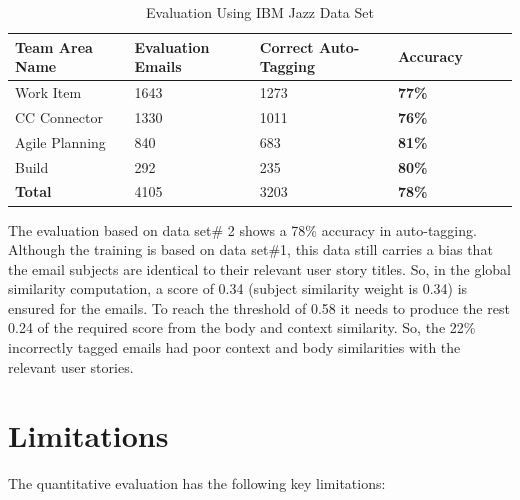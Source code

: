 \begin{table}[h!]
  \centering
  \caption{Evaluation Using IBM Jazz Data Set}
	\label{tab:jazz_evaluation}
    \begin{tabular}{|p{4cm}|p{3cm}|p{3cm}|p{2cm}|p{2cm}|p{2cm}|p{2cm}|}
      \hline
      \textbf{Team Area Name} & \textbf{Evaluation Emails} & \textbf{Correct Auto-Tagging} & \textbf{Accuracy}\\
      \hline
      Work Item 				& 1643 	 	&	1273 & \textbf{77\%}\\
      \hline
      CC Connector 			& 1330 			&	1011	& \textbf{76\%}\\
      \hline
      Agile Planning 		& 840 		 	& 683		& \textbf{81\%}\\
   		\hline
      Build 						& 292 			&	235		& \textbf{80\%}\\
      \hline
      \textbf{Total} 		& 4105 				& 3203 	& \textbf{78\%}\\
      \hline
    \end{tabular}
\end{table}

The evaluation based on data set\# 2 shows a 78\% accuracy in auto-tagging. Although the training is based on data set\#1, this data still carries a bias that the email subjects are identical to their relevant user story titles. So, in the global similarity computation, a score of 0.34 (subject similarity weight is 0.34) is ensured for the emails. To reach the threshold of 0.58 it needs to produce the rest 0.24 of the required score from the body and context similarity. So, the 22\% incorrectly tagged emails had poor context and body similarities with the relevant user stories.

\section{Limitations}
The quantitative evaluation has the following key limitations:

